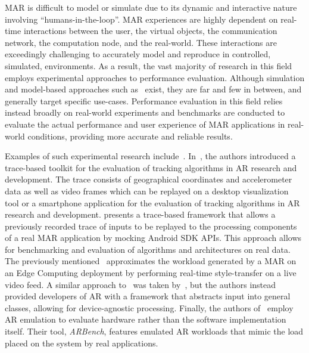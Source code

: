 \gls{MAR} is difficult to model or simulate due to its dynamic and interactive nature involving ``humans-in-the-loop''.
\gls{MAR} experiences are highly dependent on real-time interactions between the user, the virtual objects, the communication network, the computation node, and the real-world.
These interactions are exceedingly challenging to accurately model and reproduce in controlled, simulated, environments.
As a result, the vast majority of research in this field employs experimental approaches to performance evaluation.
Although simulation and model-based approaches such as~\cite{liubogoshchev2021adaptive,sundararajan2021performance} exist, they are far and few in between, and generally target specific use-cases.
Performance evaluation in this field relies instead broadly on real-world experiments and benchmarks are conducted to evaluate the actual performance and user experience of \gls{MAR} applications in real-world conditions, providing more accurate and reliable results.

Examples of such experimental research include~\cite{williams2013transform,munro2016aaremu,george2020openrtist,choi2022emulating,chetoui2022arbench}.
In~\cite{williams2013transform}, the authors introduced a trace-based toolkit for the evaluation of tracking algorithms in \gls{AR} research and development.
The trace consists of geographical coordinates and accelerometer data as well as video frames which can be replayed on a desktop visualization tool or a smartphone application for the evaluation of tracking algorithms in \gls{AR} research and development.\@
\cite{munro2016aaremu} presents a trace-based framework that allows a previously recorded trace of inputs to be replayed to the processing components of a real \gls{MAR} application by mocking Android \gls{SDK} \glspl{API}.
This approach allows for benchmarking and evaluation of algorithms and architectures on real data.
The previously mentioned~\cite{george2020openrtist} approximates the workload generated by a \gls{MAR} on an Edge Computing deployment by performing real-time style-transfer on a live video feed. 
A similar approach to~\cite{munro2016aaremu} was taken by~\cite{choi2022emulating}, but the authors instead provided developers of \gls{AR} with a framework that abstracts input into general classes, allowing for device-agnostic processing.
Finally, the authors of~\cite{chetoui2022arbench} employ \gls{AR} emulation to evaluate hardware rather than the software implementation itself.
Their tool, \emph{ARBench}, features emulated \gls{AR} workloads that mimic the load placed on the system by real applications.

